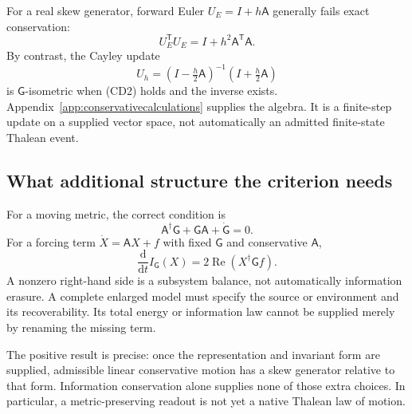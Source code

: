 For a real skew generator, forward Euler $U_E=I+h\mathsf A$ generally fails exact conservation:
\[
U_E^{\mathsf T}U_E=I+h^2\mathsf A^{\mathsf T}\mathsf A.
\]
By contrast, the Cayley update
\begin{equation}
U_h=(I-\tfrac h2\mathsf A)^{-1}(I+\tfrac h2\mathsf A)
\tag{CD4}\label{eq:cayley}
\end{equation}
is $\mathsf G$-isometric when (CD2) holds and the inverse exists. Appendix~\ref{app:conservativecalculations} supplies the algebra. It is a finite-step update on a supplied vector space, not automatically an admitted finite-state Thalean event.

\subsection{What additional structure the criterion needs}
For a moving metric, the correct condition is
\begin{equation}
\mathsf A^\dagger\mathsf G+\mathsf G\mathsf A+\dot{\mathsf G}=0.
\tag{CD5}\label{eq:movingmetric}
\end{equation}
For a forcing term $\dot X=\mathsf A X+f$ with fixed $\mathsf G$ and conservative $\mathsf A$,
\begin{equation}
\frac{\mathrm d}{\mathrm dt}I_{\mathsf G}(X)
=2\operatorname{Re}(X^\dagger\mathsf G f).
\tag{CD6}\label{eq:forcedbalance}
\end{equation}
A nonzero right-hand side is a subsystem balance, not automatically information erasure. A complete enlarged model must specify the source or environment and its recoverability. Its total energy or information law cannot be supplied merely by renaming the missing term.

The positive result is precise: once the representation and invariant form are supplied, admissible linear conservative motion has a skew generator relative to that form. Information conservation alone supplies none of those extra choices. In particular, a metric-preserving readout is not yet a native Thalean law of motion.
\endgroup
\setcounter{section}{37}
